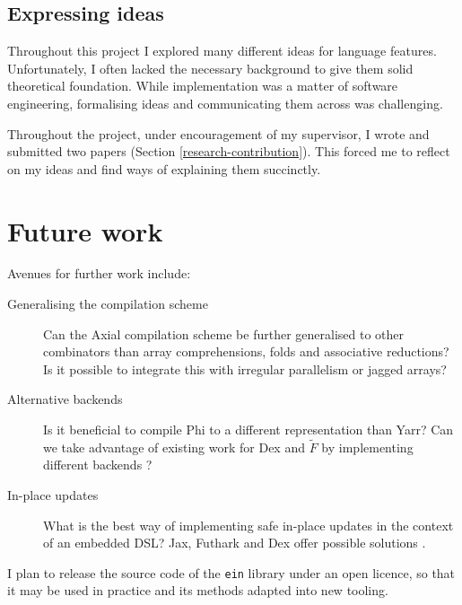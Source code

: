 \subsection{Expressing ideas}

Throughout this project I explored many different ideas for language features. 
Unfortunately, I often lacked the necessary background to give them solid theoretical foundation. 
While implementation was a matter of software engineering, formalising ideas and communicating them across was challenging. 

Throughout the project, under encouragement of my supervisor, I wrote and submitted two papers (Section \ref{research-contribution}). 
This forced me to reflect on my ideas and find ways of explaining them succinctly.

\section{Future work}

Avenues for further work include:
\begin{description}
    \item[Generalising the compilation scheme] Can the Axial compilation scheme be further generalised to other combinators than array comprehensions, folds and associative reductions? Is it possible to integrate this with irregular parallelism or jagged arrays?
    \item[Alternative backends] Is it beneficial to compile Phi to a different representation than Yarr? 
    Can we take advantage of existing work for Dex and $\tilde F$ by implementing different backends \cite{shaikhha2019efficient, paszke2021getting}?
    \item[In-place updates] What is the best way of implementing safe in-place updates in the context of an embedded DSL? 
    Jax, Futhark and Dex offer possible solutions \cite{frostig2018compiling, henriksen2017futhark, paszke2021getting}.
\end{description}
I plan to release the source code of the \texttt{ein} library under an open licence, so that it may be used in practice and its methods adapted into new tooling.